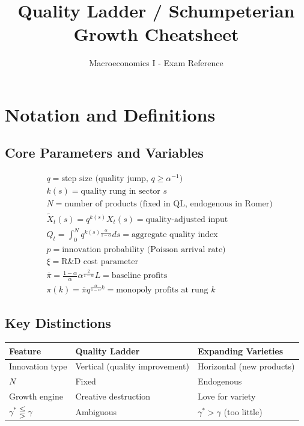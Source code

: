 \documentclass[a4paper,11pt]{article}
\title{\textbf{Quality Ladder / Schumpeterian Growth Cheatsheet}}
\author{Macroeconomics I - Exam Reference}
\date{}
\begin{document}
\maketitle

\tableofcontents

\clearpage
\pagestyle{plain}

\section{Notation and Definitions}

\subsection*{Core Parameters and Variables}
\begin{align*}
& q = \text{step size (quality jump, } q \geq \alpha^{-1}\text{)} \\
& k(s) = \text{quality rung in sector } s \\
& N = \text{number of products (fixed in QL, endogenous in Romer)} \\
& \tilde{X}_t(s) = q^{k(s)} X_t(s) = \text{quality-adjusted input} \\
& Q_t = \int_0^N q^{k(s)\frac{\alpha}{1-\alpha}} ds = \text{aggregate quality index} \\
& p = \text{innovation probability (Poisson arrival rate)} \\
& \xi = \text{R\&D cost parameter} \\
& \overline{\pi} = \frac{1-\alpha}{\alpha}\alpha^{\frac{2}{1-\alpha}}L = \text{baseline profits} \\
& \pi(k) = \overline{\pi}q^{\frac{\alpha}{1-\alpha}k} = \text{monopoly profits at rung } k
\end{align*}

\medskip
\subsection*{Key Distinctions}
\begin{center}
\begin{tabular}{lll}
\toprule
\textbf{Feature} & \textbf{Quality Ladder} & \textbf{Expanding Varieties} \\
\midrule
Innovation type & Vertical (quality improvement) & Horizontal (new products) \\
$N$ & Fixed & Endogenous \\
Growth engine & Creative destruction & Love for variety \\
$\gamma^* \lesseqqgtr \gamma$ & Ambiguous & $\gamma^* > \gamma$ (too little) \\
\bottomrule
\end{tabular}
\end{center}
\end{document}
